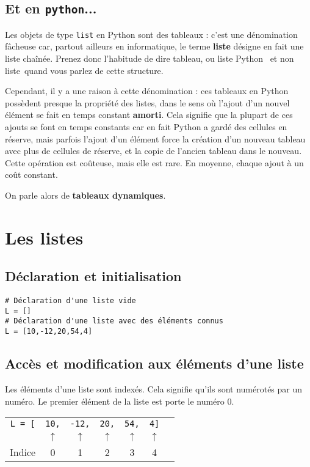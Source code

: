 \subsection{Et en \texttt{python}...}

Les objets de type \texttt{list} en Python sont des tableaux : c'est une 
dénomination fâcheuse car, partout ailleurs en informatique, le terme
\textbf{liste} désigne en fait une liste chaînée. Prenez donc
l'habitude de dire \og tableau\fg, ou \og liste Python \fg\ et non \og liste\fg\ quand vous parlez de cette
structure.

Cependant, il y a une raison à cette dénomination : ces tableaux en Python possèdent presque 
la propriété des listes, dans le sens où l'ajout d'un nouvel élément se fait en temps constant 
\textbf{amorti}. Cela signifie que la plupart de ces ajouts se font en temps constants car en fait 
Python a \og gardé des cellules en réserve\fg, mais parfois l'ajout d'un élément force la création 
d'un nouveau tableau avec plus de cellules de réserve, et la copie de l'ancien tableau dans le 
nouveau. Cette opération est coûteuse, mais elle 
est rare. En moyenne, chaque ajout à un coût constant.

On parle alors de \textbf{tableaux dynamiques}.



\section{Les listes}

\subsection{Déclaration et initialisation}
\begin{lstlisting}
# Déclaration d'une liste vide
L = []
# Déclaration d'une liste avec des éléments connus
L = [10,-12,20,54,4]
\end{lstlisting}

\subsection{Accès et modification aux éléments d'une liste}

Les éléments d'une liste sont indexés. Cela signifie qu'ils sont numérotés par un numéro. Le premier élément de la liste est porte le numéro 0.
\begin{center}
\begin{tabular}{ccccccc}
\texttt{L = [} & \texttt{10,} & \texttt{-12,} & \texttt{20,} & \texttt{54,} & \texttt{4]} \\
& $\uparrow$& $\uparrow$& $\uparrow$& $\uparrow$& $\uparrow$\\

Indice & 0& 1& 2 & 3 & 4 \\
\end{tabular}
\end{center}

